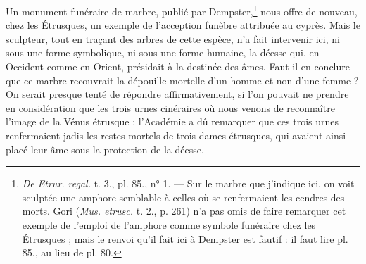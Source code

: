 \documentclass{article}
\begin{document}
Un monument funéraire de marbre, publié par Dempster,\footnote{\emph{De Etrur. regal.} t. 3., pl. 85., n° 1. --- Sur le marbre que j'indique ici, on voit sculptée une amphore semblable à celles où se renfermaient les cendres des morts. Gori (\emph{Mus. etrusc.} t. 2., p. 261) n'a pas omis de faire remarquer cet exemple de l'emploi de l'amphore comme symbole funéraire chez les Étrusques ; mais le renvoi qu'il fait ici à Dempster est fautif : il faut lire pl. 85., au lieu de pl. 80.} nous offre de nouveau, chez les Étrusques, un exemple de l'acception funèbre attribuée au cyprès. Mais le sculpteur, tout en traçant des arbres de cette espèce, n'a fait intervenir ici, ni sous une forme symbolique, ni sous une forme humaine, la déesse qui, en Occident comme en Orient, présidait à la destinée des âmes. Faut-il en conclure que ce marbre recouvrait la dépouille mortelle d'un homme et non d'une femme ? On serait presque tenté de répondre affirmativement, si l'on pouvait ne prendre en considération que les trois urnes cinéraires où nous venons de reconnaître l'image de la Vénus étrusque : l'Académie a dû remarquer que ces trois urnes renfermaient jadis les restes mortels de trois dames étrusques, qui avaient ainsi placé leur âme sous la protection de la déesse.
\end{document}
